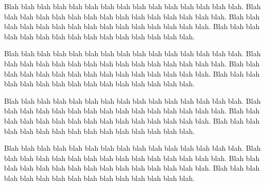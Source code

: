 
Blah blah blah blah blah blah blah blah blah blah blah blah blah blah blah.
Blah blah blah blah blah blah blah blah blah blah blah blah blah blah blah.
Blah blah blah blah blah blah blah blah blah blah blah blah blah blah blah.
Blah blah blah blah blah blah blah blah blah blah blah blah blah blah blah.

Blah blah blah blah blah blah blah blah blah blah blah blah blah blah blah.
Blah blah blah blah blah blah blah blah blah blah blah blah blah blah blah.
Blah blah blah blah blah blah blah blah blah blah blah blah blah blah blah.
Blah blah blah blah blah blah blah blah blah blah blah blah blah blah blah.

Blah blah blah blah blah blah blah blah blah blah blah blah blah blah blah.
Blah blah blah blah blah blah blah blah blah blah blah blah blah blah blah.
Blah blah blah blah blah blah blah blah blah blah blah blah blah blah blah.
Blah blah blah blah blah blah blah blah blah blah blah blah blah blah blah.

Blah blah blah blah blah blah blah blah blah blah blah blah blah blah blah.
Blah blah blah blah blah blah blah blah blah blah blah blah blah blah blah.
Blah blah blah blah blah blah blah blah blah blah blah blah blah blah blah.
Blah blah blah blah blah blah blah blah blah blah blah blah blah blah blah.
